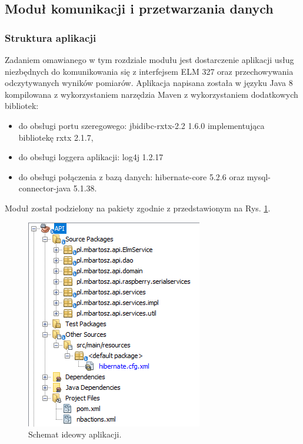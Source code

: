 \documentclass[12pt]{article} %
\numberwithin{equation}{subsection}
\numberwithin{figure}{section}
\numberwithin{table}{section}
\begin{document}
\subsection{Moduł komunikacji i przetwarzania danych}\label{rozdzial_raspberry_software}
	\subsubsection{Struktura aplikacji}\label{rozdzial_pakiety_api}
	\hspace{0.5cm}Zadaniem omawianego w tym rozdziale modułu jest dostarczenie aplikacji usług niezbędnych do komunikowania się z interfejsem ELM 327 oraz przechowywania odczytywanych wyników pomiarów. Aplikacja napisana została w języku Java 8 kompilowana z wykorzystaniem narzędzia Maven z wykorzystaniem dodatkowych bibliotek:

	\begin{itemize}
		\item{do obsługi portu szeregowego: jbidibc-rxtx-2.2 1.6.0 implementująca bibliotekę rxtx 2.1.7,}
		\item{do obsługi loggera aplikacji: log4j 1.2.17}
		\item{do obsługi połączenia z bazą danych: hibernate-core 5.2.6 oraz mysql-connector-java 5.1.38.}
	\end{itemize}
	
	Moduł został podzielony na pakiety zgodnie z przedstawionym na Rys. \ref{rys_pakiety_api}.
	
		\begin{figure}[!h]
			\centering
			\includegraphics[scale=1]{Images/rys_pakiety_api.png}
			\caption{Schemat ideowy aplikacji.}
			\label{rys_pakiety_api}
		\end{figure}
		
\end{document}
